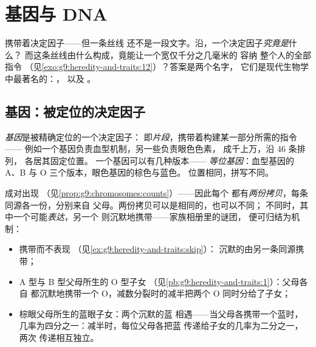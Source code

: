 \chapter{基因与 DNA}\label{ch:g9:genes-and-dna}

携带着决定因子——但一条丝线
还不是一段文字。沿，一个决定因子\emph{究竟是}什么？
而这条丝线由什么构成，竟能让一个宽仅千分之几毫米的
容纳
整个人的全部指令
（见\cref{exo:g9:heredity-and-traits:12}）？答案是两个名字，
它们是现代生物学中最著名的：，
以及 。

\section{基因：被定位的决定因子}

\begin{definition}[基因与等位基因]\label{def:g9:genes-and-dna:gene}
\emph{基因}是被精确定位的一个决定因子：
即\emph{片段}，携带着构建某一部分所需的指令——
例如一个基因负责血型机制，另一些负责眼色色素，
成千上万，沿 46 条排列，
各居其固定位置。
一个基因可以有几种版本——
\emph{等位基因}：血型基因的 A、B
与 O 三个版本，眼色基因的棕色与蓝色。
位置相同，拼写不同。
\end{definition}

\begin{proposition}\label{prop:g9:genes-and-dna:twocopies}
成对出现
（见\cref{prop:g9:chromosomes:counts}）——因此每个
都有\emph{两份拷贝}，每条同源各一份，分别来自
父母。两份拷贝可以是相同的，也可以不同；
不同时，其中一个可能\emph{表达}，另一个
则沉默地携带——家族相册里的谜团，
便可归结为机制：
\begin{itemize}
  \item 携带而不表现
        （见\cref{ex:g9:heredity-and-traits:skip}）：
        沉默的由另一条同源携带；
  \item A 型与 B 型父母所生的 O 型子女
        （见\cref{pb:g9:heredity-and-traits:1}）：父母各自
        都沉默地携带一个 O，减数分裂时的减半把两个 O
        同时分给了子女；
  \item 棕眼父母所生的蓝眼子女：两个沉默的蓝
        相遇——当父母各携带一个蓝时，
        几率为四分之一：减半时，每位父母各把蓝
        传递给子女的几率为二分之一，两次
        传递相互独立。
\end{itemize}
\end{proposition}
\admitted

